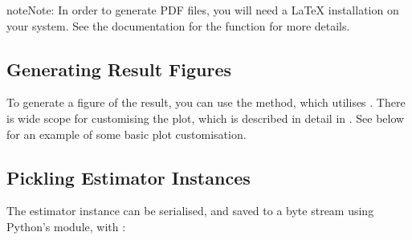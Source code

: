 \documentclass[letterpaper,10pt,english]{sphinxmanual}
\begin{document}
\begin{sphinxadmonition}{note}{Note:}
\sphinxAtStartPar
In order to generate PDF files, you will need a LaTeX installation on
your system. See the documentation for the
{\hyperref[\detokenize{references/write:nmrespy.write.write_result}]{}} function for more details.
\end{sphinxadmonition}


\subsection{Generating Result Figures}
\label{\detokenize{walkthrough:generating-result-figures}}
\sphinxAtStartPar
To generate a figure of the result, you can use the
{\hyperref[\detokenize{references/core:nmrespy.core.Estimator.plot_result}]{}} method, which utilises
. There is wide scope for customising
the plot, which is described in detail in
{\hyperref[\detokenize{misc/figure_customisation::doc}]{}}.
See {\hyperref[\detokenize{walkthrough:summary}]{}} below for an example of some basic plot customisation.

\begin{sphinxVerbatim}[commandchars=\\\{\}]
  
\end{sphinxVerbatim}


\subsection{Pickling Estimator Instances}
\label{\detokenize{walkthrough:pickling-estimator-instances}}
\sphinxAtStartPar
The estimator instance can be serialised, and saved to a byte stream using
Python’s  module,
with {\hyperref[\detokenize{references/core:nmrespy.core.Estimator.to_pickle}]{}}:

\begin{sphinxVerbatim}[commandchars=\\\{\}]
\end{sphinxVerbatim}
\end{document}

